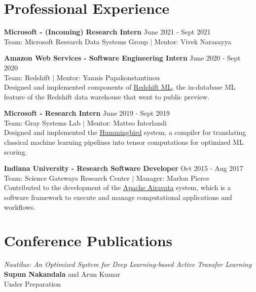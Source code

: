 \documentclass[margin]{res}
\begin{document}
\begin{resume}
\vspace{-4mm}
\section{Professional Experience}

\textbf{Microsoft - (Incoming) Research Intern}
\hfill June 2021 - Sept 2021 \\
Team: Microsoft Research Data Systems Group $|$ Mentor: Vivek Narasayya\\
\vspace{-4mm}

\textbf{Amazon Web Services - Software Engineering Intern}
\hfill June 2020 - Sept 2020 \\
Team: Redshift $|$ Mentor: Yannis Papakonstantinou\\
Designed and implemented components of \href{https://aws.amazon.com/redshift/features/redshift-ml/}{Redshift ML}, the in-database ML feature of the Redshift data warehouse that went to public preview.

\textbf{Microsoft - Research Intern}
\hfill June 2019 - Sept 2019 \\
Team: Gray Systems Lab $|$ Mentor: Matteo Interlandi\\
Designed and implemented the \href{https://github.com/microsoft/hummingbird}{Hummingbird} system, a compiler for translating classical machine learning pipelines into tensor computations for optimized ML scoring.

\textbf{Indiana University - Research Software Developer}
\hfill Oct 2015 - Aug 2017 \\
Team: Science Gateways Research Center $|$ Manager: Marlon Pierce\\
Contributed to the development of the \href{https://airavata.apache.org/index.html}{Apache Airavata} system, which is a software framework to execute and manage computational applications and workflows.

\vspace{-2mm}
\section{Conference Publications}
\par
\textit{Nautilus: An Optimized System for Deep Learning-based Active Transfer Learning} \\
\textbf{Supun Nakandala} and Arun Kumar\\
Under Preparation


\end{resume}
\end{document}
